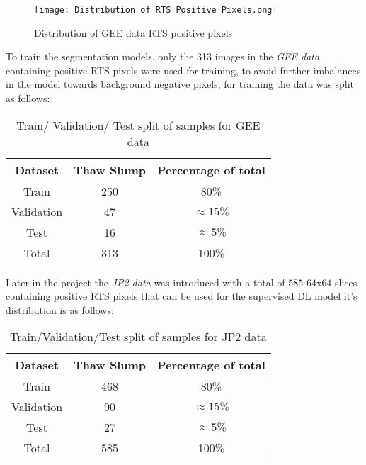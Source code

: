    \begin{figure}[hbt!]
        \centering
        \texttt{[image: Distribution of RTS Positive Pixels.png]}
        \caption{Distribution of \gls{GEE} data \gls{RTS} positive pixels}
        \label{rts_pixel_dist}
    \end{figure}
    
To train the segmentation models, only the 313 images in the \textit{\gls{GEE} data} containing positive \gls{RTS} pixels were used for training, to avoid further imbalances in the model towards background negative pixels, for training the data was split as follows:
\begin{table}[ht!] 
    \begin{center}
    \begin{tabular}{c|c|c}     
    \textbf{Dataset} & \textbf{Thaw Slump} & \textbf{Percentage of total} \\
    \hline
    Train 
    & 250 & 80\% \\
    \hline
    Validation 
    &  47 & $\approx 15\%$  \\
    \hline
    Test 
    &  16 & $\approx 5\%$ \\
    \hline
    Total 
    &  313 & 100\% \\
    \hline
    \end{tabular}
    \caption{Train/ Validation/ Test split of samples for \gls{GEE} data} \label{table_label_data_gee}
    \end{center}
\end{table}

Later in the project the \textit{\gls{JP2} data} was introduced with a total of $585$ $64$x$64$ slices containing positive \gls{RTS} pixels that can be used for the supervised \gls{DL} model it's distribution is as follows:

\begin{table}[ht!] 
    \begin{center}
    \begin{tabular}{c|c|c}     
    \textbf{Dataset} & \textbf{Thaw Slump} & \textbf{Percentage of total} \\
    \hline
    Train 
    & 468 & 80\% \\
    \hline
    Validation 
    &  90 & $\approx 15\%$  \\
    \hline
    Test 
    &  27 & $\approx 5\%$ \\
    \hline
    Total 
    &  585 & 100\% \\
    \hline
    \end{tabular}
    \end{center}
    \caption{Train/Validation/Test split of samples for \gls{JP2} data} \label{table_label_data_jp2}
\end{table}

